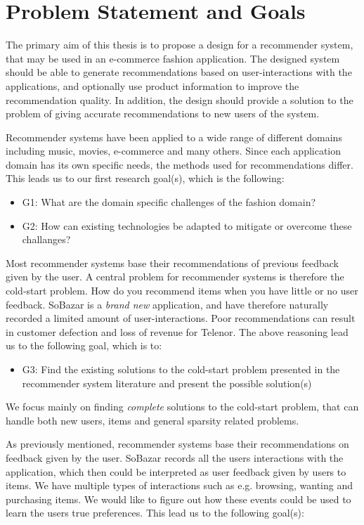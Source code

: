 \section{Problem Statement and Goals}

The primary aim of this thesis is to propose a design for a recommender system, that may be used in an
e-commerce fashion application. The designed system should be able to generate recommendations based on
user-interactions with the applications, and optionally use product information to improve the recommendation
quality. In addition, the design should provide a solution to the problem of giving accurate recommendations
to new users of the system.

Recommender systems have been applied to a wide range of different domains including music, movies, e-commerce
and many others. Since each application domain has its own specific needs, the methods used for recommendations differ. 
This leads us to our first research goal(s), which is the following:

\begin{itemize}
  \item G1: What are the domain specific challenges of the fashion domain?
  \item G2: How can existing technologies be adapted to mitigate or overcome these challanges?
\end{itemize}

Most recommender systems base their recommendations of previous feedback given by the user. A central problem for
recommender systems is therefore the cold-start problem. How do you recommend items when you have little or no
user feedback. SoBazar is a \emph{brand new} application, and have therefore naturally recorded a limited amount
of user-interactions. Poor recommendations can result in customer defection and loss of revenue for Telenor.
The above reasoning lead us to the following goal, which is to:

\begin{itemize}
  \item G3: Find the existing solutions to the cold-start problem presented in the recommender system literature
  		and present the possible solution(s)
\end{itemize}

We focus mainly on finding \emph{complete} solutions to the cold-start problem, that can handle both new users, items
and general sparsity related problems.

As previously mentioned, recommender systems base their recommendations on feedback given by the user. SoBazar records
all the users interactions with the application, which then could be interpreted as user feedback given by users to items.
We have multiple types of interactions such as e.g. browsing, wanting and purchasing items. We would like to figure out
how these events could be used to learn the users true preferences. This lead us to the following goal(s):

